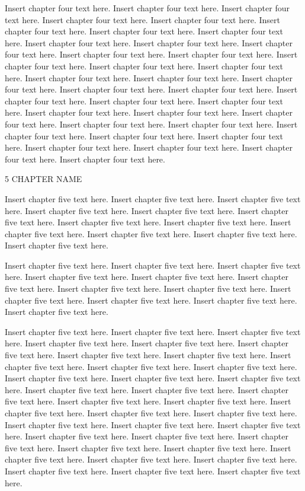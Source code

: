 Insert chapter four text here. Insert chapter four text here. Insert chapter four text here. Insert chapter four text here. Insert chapter four text here. Insert chapter four text here. Insert chapter four text here. Insert chapter four text here. Insert chapter four text here. Insert chapter four text here. Insert chapter four text here. Insert chapter four text here. Insert chapter four text here. Insert chapter four text here. Insert chapter four text here. Insert chapter four text here. Insert chapter four text here. Insert chapter four text here. Insert chapter four text here. Insert chapter four text here. Insert chapter four text here. Insert chapter four text here. Insert chapter four text here. Insert chapter four text here. Insert chapter four text here. Insert chapter four text here. Insert chapter four text here. Insert chapter four text here. Insert chapter four text here. Insert chapter four text here. Insert chapter four text here. Insert chapter four text here. Insert chapter four text here. Insert chapter four text here. Insert chapter four text here. Insert chapter four text here.

5 CHAPTER NAME

Insert chapter five text here. Insert chapter five text here. Insert chapter five text here. Insert chapter five text here. Insert chapter five text here. Insert chapter five text here. Insert chapter five text here. Insert chapter five text here. Insert chapter five text here. Insert chapter five text here. Insert chapter five text here. Insert chapter five text here.

Insert chapter five text here. Insert chapter five text here. Insert chapter five text here. Insert chapter five text here. Insert chapter five text here. Insert chapter five text here. Insert chapter five text here. Insert chapter five text here. Insert chapter five text here. Insert chapter five text here. Insert chapter five text here. Insert chapter five text here.

Insert chapter five text here. Insert chapter five text here. Insert chapter five text here. Insert chapter five text here. Insert chapter five text here. Insert chapter five text here. Insert chapter five text here. Insert chapter five text here. Insert chapter five text here. Insert chapter five text here. Insert chapter five text here. Insert chapter five text here. Insert chapter five text here. Insert chapter five text here. Insert chapter five text here. Insert chapter five text here. Insert chapter five text here. Insert chapter five text here. Insert chapter five text here. Insert chapter five text here. Insert chapter five text here. Insert chapter five text here. Insert chapter five text here. Insert chapter five text here. Insert chapter five text here. Insert chapter five text here. Insert chapter five text here. Insert chapter five text here. Insert chapter five text here. Insert chapter five text here. Insert chapter five text here. Insert chapter five text here. Insert chapter five text here. Insert chapter five text here. Insert chapter five text here. Insert chapter five text here.

